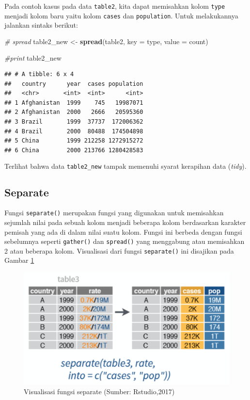 \documentclass[]{book}
\newenvironment{Shaded}{\begin{snugshade}}{\end{snugshade}}
\newcommand{\KeywordTok}[1]{\textcolor[rgb]{0.13,0.29,0.53}{\textbf{#1}}}
\newcommand{\DataTypeTok}[1]{\textcolor[rgb]{0.13,0.29,0.53}{#1}}
\newcommand{\StringTok}[1]{\textcolor[rgb]{0.31,0.60,0.02}{#1}}
\newcommand{\CommentTok}[1]{\textcolor[rgb]{0.56,0.35,0.01}{\textit{#1}}}
\newcommand{\NormalTok}[1]{#1}
\begin{document}
Pada contoh kasus pada data \texttt{table2}, kita dapat memisahkan kolom
\texttt{type} menjadi kolom baru yaitu kolom \texttt{cases} dan
\texttt{population}. Untuk melakukannya jalankan sintaks berikut:

\begin{Shaded}
\begin{Highlighting}[]
\CommentTok{# spread}
\NormalTok{table2_new <-}\StringTok{ }\KeywordTok{spread}\NormalTok{(table2,}
                        \DataTypeTok{key =}\NormalTok{ type,}
                        \DataTypeTok{value =}\NormalTok{ count)}

\CommentTok{#print}
\NormalTok{table2_new}
\end{Highlighting}
\end{Shaded}

\begin{verbatim}
## # A tibble: 6 x 4
##   country      year  cases population
##   <chr>       <int>  <int>      <int>
## 1 Afghanistan  1999    745   19987071
## 2 Afghanistan  2000   2666   20595360
## 3 Brazil       1999  37737  172006362
## 4 Brazil       2000  80488  174504898
## 5 China        1999 212258 1272915272
## 6 China        2000 213766 1280428583
\end{verbatim}

Terlihat bahwa data \texttt{table2\_new} tampak memenuhi syarat
kerapihan data (\emph{tidy}).

\subsection{Separate}\label{separate}

Fungsi \texttt{separate()} merupakan fungsi yang digunakan untuk
memisahkan sejumlah nilai pada sebuah kolom menjadi beberapa kolom
berdasarkan karakter pemisah yang ada di dalam nilai suatu kolom. Fungsi
ini berbeda dengan fungsi sebelumnya seperti \texttt{gather()} dan
\texttt{spread()} yang menggabung atau memisahkan 2 atau beberapa kolom.
Visualisasi dari fungsi \texttt{separate()} ini disajikan pada Gambar
\ref{fig:separate}

\begin{figure}

{\centering \includegraphics[width=6.79in]{separate} 

}

\caption{Visualisasi fungsi separate (Sumber: Rstudio,2017)}\label{fig:separate}
\end{figure}
\end{document}
